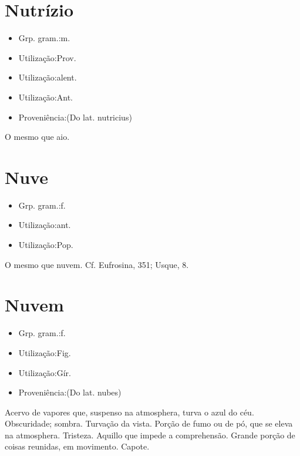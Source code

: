 \section{Nutrízio}
\begin{itemize}
\item {Grp. gram.:m.}
\end{itemize}
\begin{itemize}
\item {Utilização:Prov.}
\end{itemize}
\begin{itemize}
\item {Utilização:alent.}
\end{itemize}
\begin{itemize}
\item {Utilização:Ant.}
\end{itemize}
\begin{itemize}
\item {Proveniência:(Do lat. \textunderscore nutricius\textunderscore )}
\end{itemize}
O mesmo que \textunderscore aio\textunderscore .
\section{Nuve}
\begin{itemize}
\item {Grp. gram.:f.}
\end{itemize}
\begin{itemize}
\item {Utilização:ant.}
\end{itemize}
\begin{itemize}
\item {Utilização:Pop.}
\end{itemize}
O mesmo que \textunderscore nuvem\textunderscore . Cf. \textunderscore Eufrosina\textunderscore , 351; Usque, 8.
\section{Nuvem}
\begin{itemize}
\item {Grp. gram.:f.}
\end{itemize}
\begin{itemize}
\item {Utilização:Fig.}
\end{itemize}
\begin{itemize}
\item {Utilização:Gír.}
\end{itemize}
\begin{itemize}
\item {Proveniência:(Do lat. \textunderscore nubes\textunderscore )}
\end{itemize}
Acervo de vapores que, suspenso na atmosphera, turva o azul do céu.
Obscuridade; sombra.
Turvação da vista.
Porção de fumo ou de pó, que se eleva na atmosphera.
Tristeza.
Aquillo que impede a comprehensão.
Grande porção de coisas reunidas, em movimento.
Capote.
